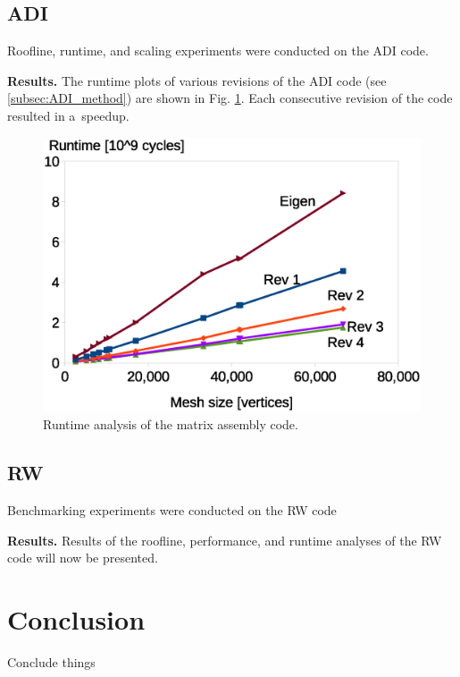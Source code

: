 \documentclass[letterpaper]{article}
\newcommand{\mypar}[1]{{\bf #1.}}
\begin{document}
\subsection{ADI}\label{subsec:ADI_results}
Roofline, runtime, and scaling experiments were conducted on the ADI code.

\mypar{Results}
The runtime plots of various revisions of the ADI code (see \ref{subsec:ADI_method}) are shown in Fig. \ref{fig:runtime_assemby}. Each consecutive revision of the code resulted in a~speedup.

\begin{figure}\centering
  \includegraphics[width=\linewidth]{./plots/assembly_runtime.eps}
  \caption{Runtime analysis of the matrix assembly code.}
  \label{fig:runtime_assemby}
\end{figure}

\subsection{RW}\label{subsec:RW_results}
Benchmarking experiments were conducted on the RW code

\mypar{Results}
Results of the roofline, performance, and runtime analyses of the RW code will now be presented.


\section{Conclusion}
Conclude things

\end{document}

